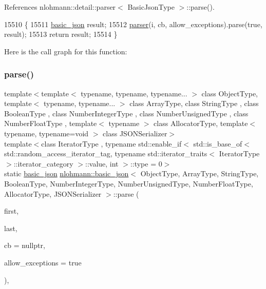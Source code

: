References nlohmann\+::detail\+::parser$<$ Basic\+Json\+Type $>$\+::parse().


\begin{DoxyCode}
15510     \{
15511         \hyperlink{classnlohmann_1_1basic__json_aed115142bd0c6c66c864700e0467df55}{basic\_json} result;
15512         \hyperlink{classnlohmann_1_1basic__json_aba9704e82d18f8954f9925e26cec7a51}{parser}(i, cb, allow\_exceptions).parse(\textcolor{keyword}{true}, result);
15513         \textcolor{keywordflow}{return} result;
15514     \}
\end{DoxyCode}
Here is the call graph for this function\+:
\mbox{\label{classnlohmann_1_1basic__json_ab330c13ba254ea41fbc1c52c5c610f45}} 
\subsubsection{\texorpdfstring{parse()}{parse()}\hspace{0.1cm}{\footnotesize\ttfamily [3/3]}}
{\footnotesize\ttfamily template$<$template$<$ typename, typename, typename... $>$ class Object\+Type, template$<$ typename, typename... $>$ class Array\+Type, class String\+Type , class Boolean\+Type , class Number\+Integer\+Type , class Number\+Unsigned\+Type , class Number\+Float\+Type , template$<$ typename $>$ class Allocator\+Type, template$<$ typename, typename=void $>$ class J\+S\+O\+N\+Serializer$>$ \\
template$<$class Iterator\+Type , typename std\+::enable\+\_\+if$<$ std\+::is\+\_\+base\+\_\+of$<$ std\+::random\+\_\+access\+\_\+iterator\+\_\+tag, typename std\+::iterator\+\_\+traits$<$ Iterator\+Type $>$\+::iterator\+\_\+category $>$\+::value, int $>$\+::type  = 0$>$ \\
static \hyperlink{classnlohmann_1_1basic__json}{basic\+\_\+json} \hyperlink{classnlohmann_1_1basic__json}{nlohmann\+::basic\+\_\+json}$<$ Object\+Type, Array\+Type, String\+Type, Boolean\+Type, Number\+Integer\+Type, Number\+Unsigned\+Type, Number\+Float\+Type, Allocator\+Type, J\+S\+O\+N\+Serializer $>$\+::parse (\begin{DoxyParamCaption}\item[{Iterator\+Type}]{first,  }\item[{Iterator\+Type}]{last,  }\item[{const \hyperlink{classnlohmann_1_1basic__json_ab4f78c5f9fd25172eeec84482e03f5b7}{parser\+\_\+callback\+\_\+t}}]{cb = {\ttfamily nullptr},  }\item[{const bool}]{allow\+\_\+exceptions = {\ttfamily true} }\end{DoxyParamCaption})\hspace{0.3cm}{\ttfamily [inline]}, {\ttfamily [static]}}



